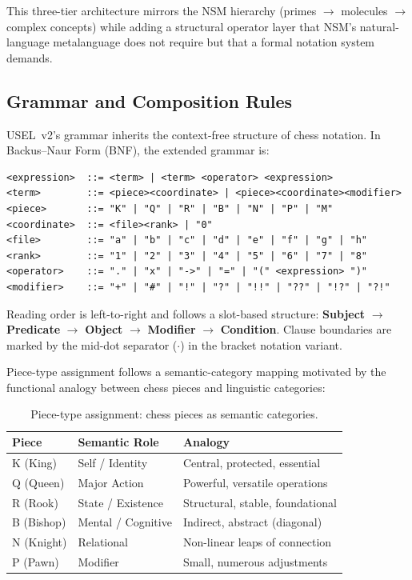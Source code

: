 \documentclass[11pt,a4paper]{article}
\begin{document}
This three-tier architecture mirrors the NSM hierarchy (primes $\rightarrow$ molecules $\rightarrow$ complex concepts) while adding a structural operator layer that NSM's natural-language metalanguage does not require but that a formal notation system demands.

\subsection{Grammar and Composition Rules}
\label{sec:grammar}

USEL~v2's grammar inherits the context-free structure of chess notation. In Backus--Naur Form (BNF), the extended grammar is:

\begin{lstlisting}
<expression>  ::= <term> | <term> <operator> <expression>
<term>        ::= <piece><coordinate> | <piece><coordinate><modifier>
<piece>       ::= "K" | "Q" | "R" | "B" | "N" | "P" | "M"
<coordinate>  ::= <file><rank> | "0"
<file>        ::= "a" | "b" | "c" | "d" | "e" | "f" | "g" | "h"
<rank>        ::= "1" | "2" | "3" | "4" | "5" | "6" | "7" | "8"
<operator>    ::= "." | "x" | "->" | "=" | "(" <expression> ")"
<modifier>    ::= "+" | "#" | "!" | "?" | "!!" | "??" | "!?" | "?!"
\end{lstlisting}

Reading order is left-to-right and follows a slot-based structure: \textbf{Subject} $\rightarrow$ \textbf{Predicate} $\rightarrow$ \textbf{Object} $\rightarrow$ \textbf{Modifier} $\rightarrow$ \textbf{Condition}. Clause boundaries are marked by the mid-dot separator (\texttt{$\cdot$}) in the bracket notation variant.

Piece-type assignment follows a semantic-category mapping motivated by the functional analogy between chess pieces and linguistic categories:

\begin{table}[h!]
\centering
\caption{Piece-type assignment: chess pieces as semantic categories.}
\label{tab:piece-types}
\small
\begin{tabular}{lll}
\toprule
\textbf{Piece} & \textbf{Semantic Role} & \textbf{Analogy} \\
\midrule
K (King) & Self / Identity & Central, protected, essential \\
Q (Queen) & Major Action & Powerful, versatile operations \\
R (Rook) & State / Existence & Structural, stable, foundational \\
B (Bishop) & Mental / Cognitive & Indirect, abstract (diagonal) \\
N (Knight) & Relational & Non-linear leaps of connection \\
P (Pawn) & Modifier & Small, numerous adjustments \\
\bottomrule
\end{tabular}
\end{table}
\end{document}
